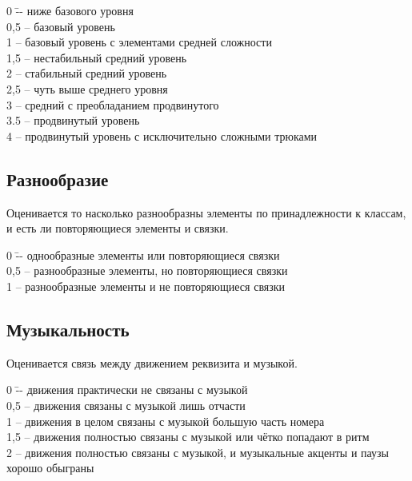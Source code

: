 \documentclass[12pt]{article}
\begin{document}
\begin{tabbing}
0\hspace{0.8em}  \= -- ниже базового уровня\\
0,5 \>-- базовый уровень\\
1 \>-- базовый уровень с элементами средней сложности\\
1,5 \> -- нестабильный средний уровень\\
2 \>-- стабильный средний уровень \\
2,5 \>-- чуть выше среднего уровня \\
3 \>-- средний с преобладанием продвинутого\\
3.5 \>-- продвинутый уровень\\ 
4 \>-- продвинутый уровень с исключительно сложными трюками
\end{tabbing}


\subsection{Разнообразие} 
Оценивается то насколько разнообразны элементы по принадлежности к классам, и есть ли повторяющиеся элементы и связки.

\begin{tabbing}
0\hspace{0.8em}  \= -- однообразные элементы или повторяющиеся связки\\
0,5 \>-- разнообразные элементы, но повторяющиеся связки\\
1 \>-- разнообразные элементы и не повторяющиеся связки
\end{tabbing}


\subsection{Музыкальность} 
Оценивается связь между движением реквизита и музыкой.

\begin{tabbing}
0\hspace{0.8em}  \= -- движения практически не связаны с музыкой\\
0,5 \>-- движения связаны с музыкой лишь отчасти\\
1 \>-- движения в целом связаны с музыкой большую часть номера\\
1,5 \>-- движения полностью связаны с музыкой или чётко попадают в ритм\\
2 \>-- движения полностью связаны с музыкой, и музыкальные акценты и паузы хорошо обыграны
\end{tabbing}
\end{document}
